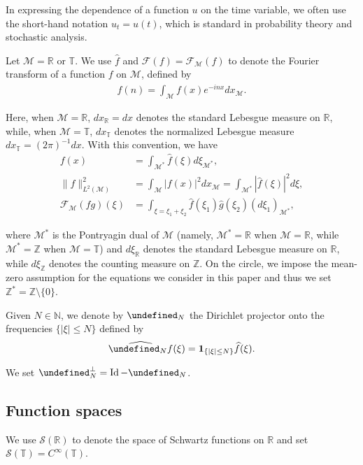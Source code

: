 \documentclass[letterpaper, 11pt,  reqno]{amsart}
\DeclareMathOperator*{\intt}{\int}
\DeclareMathOperator{\Id}{Id}
\newcommand{\1}{\hspace{0.5mm}\text{I}\hspace{0.5mm}}
\newcommand{\noi}{\noindent}
\newcommand{\Z}{\mathbb{Z}}
\newcommand{\R}{\mathbb{R}}
\newcommand{\T}{\mathbb{T}}
\let\P= \undefined
\newcommand{\P}{\mathbf{P}}
\newcommand{\F}{\mathcal{F}}
\newcommand{\ft}{\widehat}
\newcommand{\ind}{\mathbf 1}
\renewcommand{\S}{\mathcal{S}}
\newcommand{\M}{\mathcal{M}}
\newcommand{\N}{\mathbb{N}}
\numberwithin{equation}{section}
\numberwithin{theorem}{section}
\begin{document}
In expressing the dependence of a function $u$
on the time variable, we often use the short-hand notation
$u_t = u(t)$,  which is standard in probability theory and stochastic analysis.




Let $\M = \R$ or $\T$.
We  use $\ft f$ and $\F(f) = \F_\M(f)$
to denote
the  Fourier transform
of a function $f$ on $\M$, 
defined by 
\begin{align*}
\ft  f(n)=\int_{\M}f(x)e^{-i n x} d x_\M.
\end{align*}

\noi
Here, when $\M= \R$, $dx_\R = dx$ denotes
the standard Lebesgue measure on $\R$, 
while, when $\M = \T$, 
$dx_\T$ denotes
 the normalized Lebesgue measure $ dx_\T =  (2\pi)^{-1}dx$.
 With this convention, we have 
\begin{align*}
f(x)
& = \int_{\M^*} \ft f( \xi) d\xi_{\M^*}, \\
\| f\|_{L^2(\M)}^2 
& = \int_{\M}|f(x)|^2 d x_\M
= \int_{\M^*} |\ft f( \xi)|^2 d\xi, \\
\F_\M(fg)(\xi)
& =
\intt_{\xi = \xi_1 + \xi_2}
 \ft  f(\xi_1)\ft  g(\xi_2) (d\xi_1)_{\M^*}, 
\end{align*}

\noi
where $\M^*$
is the Pontryagin dual of $\M$
(namely, $\M^*=\R$ when $\M = \R$, while  $\M^* = \Z$ when $\M = \T$)
and $d\xi_\R$ denotes the standard Lebesgue measure on $\R$, 
while $d\xi_{\Z}$ denotes the counting measure on $\Z$.
On the circle, we impose the mean-zero assumption
for the equations we consider in this paper
and thus we set  $\Z^* = \Z \setminus \{0\}$.



Given $N \in \N$, 
we denote by  $\P_N$
 the Dirichlet projector onto the frequencies 
$\{|\xi| \leq N\}$
defined by 
\begin{align}
 \ft{\P_N f}(\xi)= \ind_{\{|\xi|\leq N\}} \ft f(\xi).
 \label{Diri1}
\end{align}

\noi
We set $\P_N^\perp = \Id - \P_N$.





\subsection{Function spaces}






We use 
$\S(\R)$ to denote the space of Schwartz functions on $\R$
and set
$\S(\T) = C^\infty(\T)$.
\end{document}
